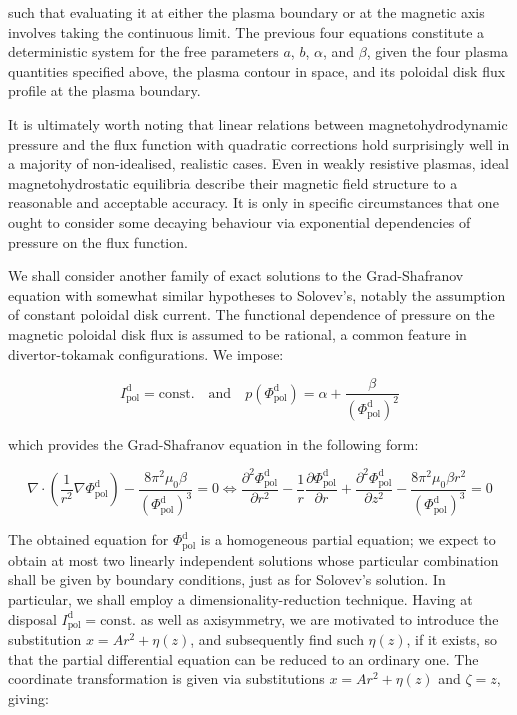 such that evaluating it at either the plasma boundary or at the magnetic axis involves taking the continuous limit. The previous four equations constitute a deterministic system for the free parameters $a$, $b$, $\alpha$, and $\beta$, given the four plasma quantities specified above, the plasma contour in space, and its poloidal disk flux profile at the plasma boundary.

\quad It is ultimately worth noting that linear relations between magnetohydrodynamic pressure and the flux function with quadratic corrections hold surprisingly well in a majority of non-idealised, realistic cases. Even in weakly resistive plasmas, ideal magnetohydrostatic equilibria describe their magnetic field structure to a reasonable and acceptable accuracy. It is only in specific circumstances that one ought to consider some decaying behaviour via exponential dependencies of pressure on the flux function.

\quad We shall consider another family of exact solutions to the Grad-Shafranov equation with somewhat similar hypotheses to Solovev's, notably the assumption of constant poloidal disk current. The functional dependence of pressure on the magnetic poloidal disk flux is assumed to be rational, a common feature in divertor-tokamak configurations. We impose:

\begin{equation}
    I_\text{pol}^\mathrm{d}=\text{const.}\quad\text{and}\quad p(\Phi_\text{pol}^\mathrm{d})=\alpha+\frac{\beta}{(\Phi_\text{pol}^\mathrm{d})^2}
\end{equation}

which provides the Grad-Shafranov equation in the following form:

\begin{equation}
    \nabla\cdot\left(\frac{1}{r^2}\nabla\Phi_\text{pol}^\mathrm{d}\right)-\frac{8\pi^2\mu_0\beta}{(\Phi_\text{pol}^\mathrm{d})^3}=0\Longleftrightarrow\frac{\partial^2\Phi_\text{pol}^\mathrm{d}}{\partial r^2}-\frac{1}{r}\frac{\partial\Phi_\text{pol}^\mathrm{d}}{\partial r}+\frac{\partial^2\Phi_\text{pol}^\mathrm{d}}{\partial z^2}-\frac{8\pi^2\mu_0\beta r^2}{(\Phi_\text{pol}^\mathrm{d})^3}=0
\end{equation}

The obtained equation for $\Phi_\text{pol}^\mathrm{d}$ is a homogeneous partial equation; we expect to obtain at most two linearly independent solutions whose particular combination shall be given by boundary conditions, just as for Solovev's solution. In particular, we shall employ a dimensionality-reduction technique. Having at disposal $I_\text{pol}^\mathrm{d}=\text{const.}$ as well as axisymmetry, we are motivated to introduce the substitution $x=Ar^2+\eta(z)$, and subsequently find such $\eta(z)$, if it exists, so that the partial differential equation can be reduced to an ordinary one. The coordinate transformation is given via substitutions $x=Ar^2+\eta(z)$ and $\zeta=z$, giving:

